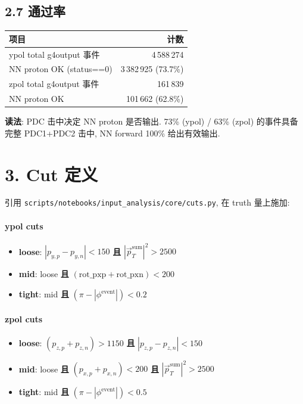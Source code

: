 \documentclass[a4paper,11pt]{article}
\begin{document}
\subsection*{2.7 通过率}
\begin{table}[H]
\centering\footnotesize
\begin{tabular}{lr}
\toprule
项目 & 计数 \\
\midrule
ypol total g4output 事件        & 4\,588\,274 \\
\quad NN proton OK (status==0)  & 3\,382\,925 (73.7\%) \\
zpol total g4output 事件        & 161\,839 \\
\quad NN proton OK              & 101\,662 (62.8\%) \\
\bottomrule
\end{tabular}
\end{table}
\textbf{读法}: PDC 击中决定 NN proton 是否输出. 73\% (ypol) / 63\% (zpol) 的事件具备完整 PDC1+PDC2 击中, NN forward 100\% 给出有效输出.

\section{3. Cut 定义}

引用 \texttt{scripts/notebooks/input\_analysis/core/cuts.py}, 在 truth 量上施加:

\paragraph{ypol cuts}
\begin{itemize}[nosep]
    \item \textbf{loose}: $|p_{y,p} - p_{y,n}| < 150$ \textbf{且} $|\vec p_T^\text{sum}|^2 > 2500$
    \item \textbf{mid}:   loose \textbf{且} $(\text{rot\_pxp} + \text{rot\_pxn}) < 200$
    \item \textbf{tight}: mid \textbf{且} $(\pi - |\phi^\text{event}|) < 0.2$
\end{itemize}

\paragraph{zpol cuts}
\begin{itemize}[nosep]
    \item \textbf{loose}: $(p_{z,p} + p_{z,n}) > 1150$ \textbf{且} $|p_{z,p} - p_{z,n}| < 150$
    \item \textbf{mid}:   loose \textbf{且} $(p_{x,p} + p_{x,n}) < 200$ \textbf{且} $|\vec p_T^\text{sum}|^2 > 2500$
    \item \textbf{tight}: mid \textbf{且} $(\pi - |\phi^\text{event}|) < 0.5$
\end{itemize}
\end{document}
